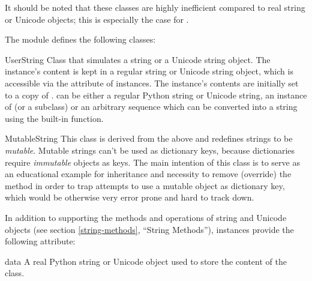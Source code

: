 It should be noted that these classes are highly inefficient compared
to real string or Unicode objects; this is especially the case for
.

The  module defines the following classes:

\begin{classdesc}{UserString}{}
Class that simulates a string or a Unicode string
object.  The instance's content is kept in a regular string or Unicode
string object, which is accessible via the  attribute of
 instances.  The instance's contents are initially
set to a copy of .   can be either a
regular Python string or Unicode string, an instance of
 (or a subclass) or an arbitrary sequence which can
be converted into a string using the built-in  function.
\end{classdesc}

\begin{classdesc}{MutableString}{}
This class is derived from the  above and redefines
strings to be \emph{mutable}.  Mutable strings can't be used as
dictionary keys, because dictionaries require \emph{immutable} objects as
keys.  The main intention of this class is to serve as an educational
example for inheritance and necessity to remove (override) the
 method in order to trap attempts to use a
mutable object as dictionary key, which would be otherwise very
error prone and hard to track down.
\end{classdesc}

In addition to supporting the methods and operations of string and
Unicode objects (see section \ref{string-methods}, ``String
Methods''),  instances provide the following
attribute:

\begin{memberdesc}{data}
A real Python string or Unicode object used to store the content of the
 class.
\end{memberdesc}
